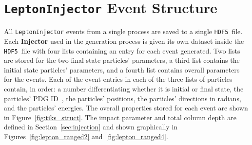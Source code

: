 \documentclass[main.tex]{subfiles}
\newcommand{\LeptonInjector}{\texttt{LeptonInjector}}
\newcommand{\hdf}{\texttt{HDF5}}
\begin{document}
\section{\LeptonInjector{} Event Structure~\label{sec:li_event}}

All \LeptonInjector{} events from a single process are saved to a single \hdf~file. Each \textbf{Injector} used in the generation process is given its own dataset inside the \hdf~file with four lists containing an entry for each event generated. Two lists are stored for the two final state particles' parameters, a third list contains the initial state particles' parameters, and a fourth list contains overall parameters for the events.
Each of the event-entries in each of the three lists of particles contain, in order: a number differentiating whether it is initial or final state, the particles' PDG ID~\cite{PhysRevD.98.030001}, the particles' positions, the particles' directions in radians, and the particles' energies. 
The overall properties stored for each event are shown in Figure~\ref{fig:tiks_struct}.
The impact parameter and total column depth are defined in Section~\ref{sec:injection} and shown graphically in Figures~\ref{fig:lepton_ranged2} and~\ref{fig:lepton_ranged4}.
\end{document}
